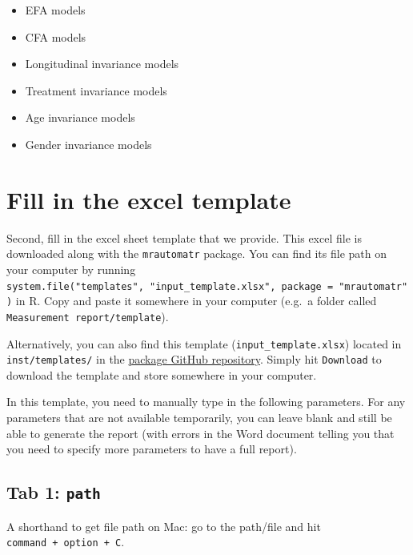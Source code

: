 \documentclass[
]{book}
\providecommand{\tightlist}{%
  \setlength{\itemsep}{0pt}\setlength{\parskip}{0pt}}
\begin{document}
\begin{itemize}
\tightlist
\item
  EFA models
\item
  CFA models
\item
  Longitudinal invariance models
\item
  Treatment invariance models
\item
  Age invariance models
\item
  Gender invariance models
\end{itemize}

\hypertarget{fill-in-the-excel-template}{%
\section{Fill in the excel template}\label{fill-in-the-excel-template}}

Second, fill in the excel sheet template that we provide. This excel file is downloaded along with the \texttt{mrautomatr} package. You can find its file path on your computer by running \texttt{system.file("templates",\ "input\_template.xlsx",\ package\ =\ "mrautomatr")} in R. Copy and paste it somewhere in your computer (e.g.~a folder called \texttt{Measurement\ report/template}).

Alternatively, you can also find this template (\texttt{input\_template.xlsx}) located in \texttt{inst/templates/} in the \href{https://github.com/nyuglobalties/mrautomatr}{package GitHub repository}. Simply hit \texttt{Download} to download the template and store somewhere in your computer.

In this template, you need to manually type in the following parameters. For any parameters that are not available temporarily, you can leave blank and still be able to generate the report (with errors in the Word document telling you that you need to specify more parameters to have a full report).

\hypertarget{tab-1-path}{%
\subsection{\texorpdfstring{Tab 1: \texttt{path}}{Tab 1: path}}\label{tab-1-path}}

A shorthand to get file path on Mac: go to the path/file and hit \texttt{command\ +\ option\ +\ C}.
\end{document}
